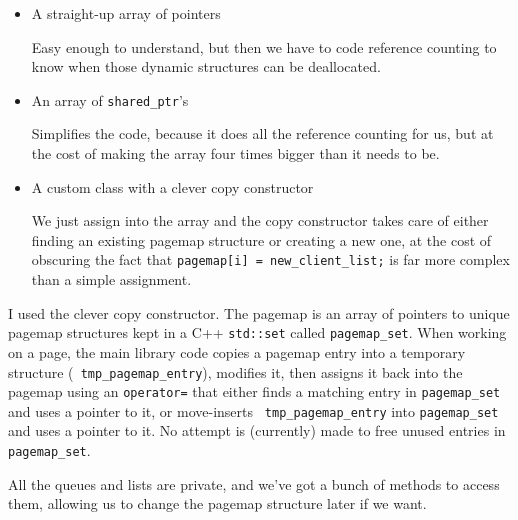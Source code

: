 \documentclass{article}
\begin{document}
\begin{itemize}

\item  A straight-up array of pointers

Easy enough to understand, but then we have to
code reference counting to know when those dynamic structures can be
deallocated.

\item An array of {\tt shared_ptr}'s

Simplifies the code, because
it does all the reference counting for us, but at the cost of making
the array four times bigger than it needs to be.

\item A custom class with a clever copy constructor

We just assign into the array and the copy constructor takes care of
either finding an existing pagemap structure or creating a new one, at
the cost of obscuring the fact that {\tt pagemap[i] = new_client_list;} is
far more complex than a simple assignment.

\end{itemize}

I used the clever copy constructor.  The pagemap is an array of
pointers to unique pagemap structures kept in a C++ {\tt std::set}
called {\tt pagemap_set}.  When working on a page, the main library
code copies a pagemap entry into a temporary structure ({\tt
  tmp_pagemap_entry}), modifies it, then assigns it back into the
pagemap using an {\tt operator=} that either finds a matching entry in
{\tt pagemap_set} and uses a pointer to it, or move-inserts {\tt
  tmp_pagemap_entry} into {\tt pagemap_set} and uses a pointer to it.
No attempt is (currently) made to free unused entries in {\tt
  pagemap_set}.

All the queues and lists are private, and we've got a bunch of methods
to access them, allowing us to change the pagemap structure later if
we want.
\end{document}
